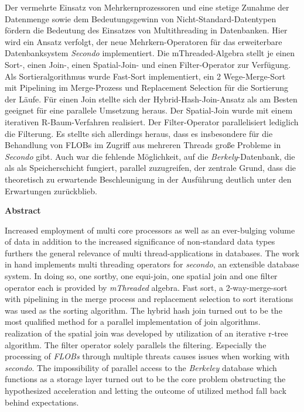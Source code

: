 \documentclass[a4paper,12pt,twoside]{article}
\newcommand{\Fb}[1]{\textit{#1}} %
\begin{document}
Der vermehrte Einsatz von Mehrkernprozessoren und eine stetige Zunahme der Datenmenge sowie dem Bedeutungsgewinn von Nicht-Standard-Datentypen fördern die Bedeutung des Einsatzes von Multithreading in Datenbanken. Hier wird ein Ansatz verfolgt, der neue Mehrkern-Operatoren für das erweiterbare Datenbanksystem \Fb{Secondo} implementiert. Die mThreaded-Algebra stellt je einen Sort-, einen Join-, einen Spatial-Join- und einen Filter-Operator zur Verfügung. Als Sortieralgorithmus wurde Fast-Sort implementiert, ein 2 Wege-Merge-Sort mit Pipelining im Merge-Prozess und Replacement Selection für die Sortierung der Läufe. Für einen Join stellte sich der Hybrid-Hash-Join-Ansatz als am Besten geeignet für eine parallele Umsetzung heraus. Der Spatial-Join wurde mit einem iterativen R-Baum-Verfahren realisiert. Der Filter-Operator parallelisiert lediglich die Filterung. Es stellte sich allerdings heraus, dass es insbesondere für die Behandlung von FLOBs im Zugriff aus mehreren Threads große Probleme in \Fb{Secondo} gibt. Auch war die fehlende Möglichkeit, auf die \Fb{Berkely}-Datenbank, die als als Speicherschicht fungiert, parallel zuzugreifen, der zentrale Grund, dass die theoretisch zu erwartende Beschleunigung in der Ausführung deutlich unter den Erwartungen zurückblieb.

\textbf{Abstract}

Increased employment of multi core processors as well as an ever-bulging volume of data in addition to the increased significance of non-standard data types furthers the general relevance of multi thread-applications in databases. The work in hand implements multi threading operators for \Fb{secondo}, an extensible database system. In doing so, one sortby, one equi-join, one spatial join and one filter operator each is provided by \Fb{mThreaded} algebra. Fast sort, a 2-way-merge-sort with pipelining in the merge process and replacement selection to sort iterations was used as the sorting algorithm. The hybrid hash join turned out to be the most qualified method for a parallel implementation of join algorithms. realization of the spatial join was developed by utilization of an iterative r-tree algorithm. The filter operator solely parallels the filtering. Especially the processing of \Fb{FLOBs} through multiple threats causes issues when working with \Fb{secondo}. The impossibility of parallel access to the \Fb{Berkeley} database which functions as a storage layer turned out to be the core problem obstructing the hypothesized acceleration and letting the outcome of utilized method fall back behind expectations.
\end{document}
